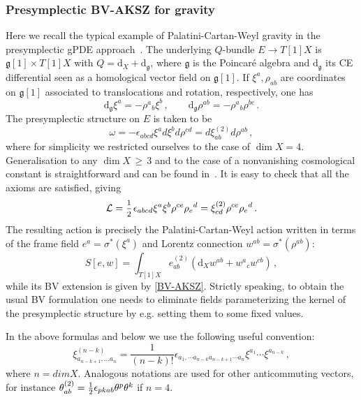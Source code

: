 \documentclass[a4paper,12pt]{article}
\numberwithin{equation}{section} %
\newcommand{\dx}{\mathrm{d}_X}
\renewcommand{\geq}{\,{\geqslant}\,}
\newcommand{\half}{\mathchoice{%
    \ffrac{1}{2}}{\frac{1}{2}}{\frac{1}{2}}{\frac{1}{2}}}
\newcommand{\ffrac}[2]{\raisebox{.5pt}%
  {\footnotesize$\displaystyle\frac{#1}{#2}$}\kern1pt}
\newcommand{\Liealg}{\mathfrak}
\newcommand{\algg}{\Liealg{g}}
\def\cL{\mathcal{L}}
\newcommand{\dg}{\mathrm{d}_\algg}
\newcommand{\lorcon}{w}
\begin{document}
\subsubsection{Presymplectic BV-AKSZ for gravity}\label{example:presymp-grav}
Here we recall the typical example of Palatini-Cartan-Weyl gravity in the presymplectic gPDE approach~\cite{Alkalaev:2013hta,Grigoriev:2020xec}. The underlying $Q$-bundle $E\to T[1]X$ is $\algg[1]\times T[1]X$ with $Q=\dx+\dg$, where $\algg$ is the Poincar\'e algebra and $\dg$ its CE differential seen as a homological vector field on $\algg[1]$. If $\xi^a, \rho_{ab}$ are coordinates on $\algg[1]$ associated to translocations and rotation, respectively, one has 
\begin{equation}
        \dg\xi^a = -\rho^{a}{ }_b \xi^b \,, \qquad \dg \rho^{ab} = -\rho^{a}{ }_b \rho^{bc}\,.
\end{equation}
The presymplectic structure on $E$ is taken to be 
\begin{equation}\label{grav-presymp}
    \omega = -\epsilon_{abcd}\xi^a d\xi^b d\rho^{cd} =d{\xi}^{(2)}_{ab} d \rho^{ab}\,,
\end{equation}
where for simplicity we restricted ourselves to the case of $\dim X=4$. Generalisation to any $\dim X \geq 3$
and to the case of a nonvanishing cosmological constant is straightforward and can be found in~\cite{Alkalaev:2013hta,Grigoriev:2020xec}. It is easy to check that all the axioms are satisfied, giving
\begin{equation}
\cL = \half \epsilon_{abcd}\xi^a\xi^b \rho^{ce}\rho_e{}^d = {\xi}^{(2)}_{cd}\rho^{ce}\rho_e{}^d \,.
\end{equation}
The resulting action is precisely the Palatini-Cartan-Weyl action written in terms of the frame field $e^a=\sigma^*(\xi^a)$ and Lorentz connection $\lorcon^{ab}=\sigma^*(\rho^{ab})$:
\begin{equation}
  S[e,\lorcon]=\int_{T[1]X}e^{(2)}_{ab}(\dx \lorcon^{ab} + \lorcon^{a}{}_c\lorcon^{cb}) \,,
\end{equation}
while its BV extension is given by \eqref{BV-AKSZ}. Strictly speaking, to obtain the usual BV formulation one needs to eliminate fields parameterizing the kernel of the presymplectic structure by e.g. setting them to some fixed values.


In the above formulas and below we use the following useful convention: 
\begin{equation}
    {\xi}^{(n-k)}_{a_{n-k+1},...a_n} = \frac{1}{(n-k)!} \epsilon_{a_1,\cdots a_{n-k} a_{n-k+1}\cdots a_n} \xi^{a_1}\cdots \xi^{a_{n-k}}\,,
\end{equation}
where $n = dim X$.
Analogous notations are used for other anticommuting vectors, for instance ${\theta}^{(2)}_{ab} = \half \epsilon_{pkab}\theta^p \theta^k$ if $n=4$.
\end{document}
